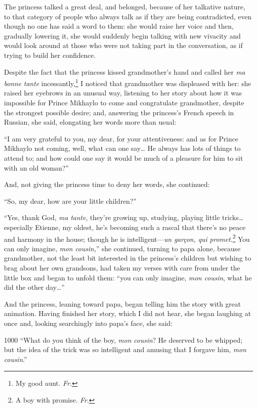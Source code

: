 The princess talked a great deal, and belonged, because of her talkative nature, to that category of people who always talk as if they are being contradicted, even though no one has said a word to them: she would raise her voice and then, gradually lowering it, she would suddenly begin talking with new vivacity and would look around at those who were not taking part in the conversation, as if trying to build her confidence.

Despite the fact that the princess kissed grandmother's hand and called her \textit{ma bonne tante} incessantly,\footnote{My good aunt. \textit{Fr.}} I noticed that grandmother was displeased with her: she raised her eyebrows in an unusual way, listening to her story about how it was impossible for Prince Mikhaylo to come and congratulate grandmother, despite the strongest possible desire; and, answering the princess's French speech in Russian, she said, elongating her words more than usual:

``I am very grateful to you, my dear, for your attentiveness: and as for Prince Mikhaylo not coming, well, what can one say\ldots{} He always has lots of things to attend to; and how could one say it would be much of a pleasure for him to sit with an old woman?'' %

And, not giving the princess time to deny her words, she continued:

``So, my dear, how are your little children?'' %

``Yes, thank God, \textit{ma tante}, they're growing up, studying, playing little tricks\ldots{}especially Etienne, my oldest, he's becoming such a rascal that there's no peace and harmony in the house; though he is intelligent---\textit{un gar\c con, qui promet.}\footnote{A boy with promise. \textit{Fr.}} You can only imagine, \textit{mon cousin,}'' she continued, turning to papa alone, because grandmother, not the least bit interested in the princess's children but wishing to brag about her own grandsons, had taken my verses with care from under the little box and began to unfold them: ``you can only imagine, \textit{mon cousin}, what he did the other day\ldots{}'' %

And the princess, leaning toward papa, began telling him the story with great animation. Having finished her story, which I did not hear, she began laughing at once and, looking searchingly into papa's face, she said:

\begin{tolerant}{1000}
``What do you think of the boy, \textit{mon cousin}? He deserved to be whipped; but the idea of the trick was so intelligent and amusing that I forgave him, \textit{mon cousin}.'' %
\end{tolerant}

